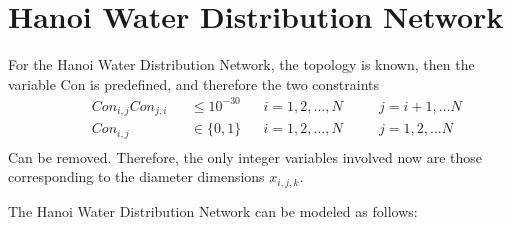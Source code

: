 \documentclass[12pt]{article}
\begin{document}
	\section{Hanoi Water Distribution Network}
	
	For the Hanoi Water Distribution Network, the topology is known, then the variable Con is predefined, and therefore the two constraints
	\begin{equation}
	\begin{aligned}
	& && Con_{i,j}Con_{j,i} && \leq 10^{-30} && i = 1, 2, ..., N \quad && j = i+1, ... N\\
	& && Con_{i,j} &&\in \{0,1\} && i = 1, 2, ..., N \quad && j = 1, 2, ... N\\
	\end{aligned}
	\end{equation}
	Can be removed. Therefore, the only integer variables involved now are those corresponding to the diameter dimensions $x_{i,j,k}$.
	
	The Hanoi Water Distribution Network can be modeled as follows:
	
\end{document}
